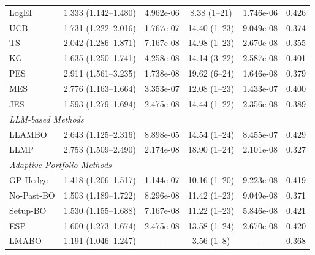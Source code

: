 \begin{table}
\begin{tabular}{@{}lccccc@{}}
LogEI & 1.333 (1.142--1.480) & 4.962e-06 & 8.38 (1--21) & 1.746e-06 & 0.426 \\
UCB & 1.731 (1.222--2.016) & 1.767e-07 & 14.40 (1--23) & 9.049e-08 & 0.374 \\
TS & 2.042 (1.286--1.871) & 7.167e-08 & 14.98 (1--23) & 2.670e-08 & 0.355 \\
KG & 1.635 (1.250--1.741) & 4.258e-08 & 14.14 (3--22) & 2.587e-08 & 0.401 \\
PES & 2.911 (1.561--3.235) & 1.738e-08 & 19.62 (6--24) & 1.646e-08 & 0.379 \\
MES & 2.776 (1.163--1.664) & 3.353e-07 & 12.08 (1--23) & 1.433e-07 & 0.400 \\
JES & 1.593 (1.279--1.694) & 2.475e-08 & 14.44 (1--22) & 2.356e-08 & 0.389 \\
\multicolumn{5}{l}{\textit{LLM-based Methods}} \\
LLAMBO & 2.643 (1.125--2.316) & 8.898e-05 & 14.54 (1--24) & 8.455e-07 & 0.429 \\
LLMP & 2.753 (1.509--2.490) & 2.174e-08 & 18.90 (1--24) & 2.101e-08 & 0.327 \\
\multicolumn{5}{l}{\textit{Adaptive Portfolio Methods}} \\
GP-Hedge & 1.418 (1.206--1.517) & 1.144e-07 & 10.16 (1--20) & 9.223e-08 & 0.419 \\
No-Past-BO & 1.503 (1.189--1.722) & 8.296e-08 & 11.42 (1--23) & 9.049e-08 & 0.371 \\
Setup-BO & 1.530 (1.155--1.688) & 7.167e-08 & 11.22 (1--23) & 5.846e-08 & 0.421 \\
ESP & 1.600 (1.273--1.674) & 2.475e-08 & 13.58 (1--24) & 2.670e-08 & 0.420 \\
\midrule
LMABO & 1.191 (1.046--1.247) & -- & 3.56 (1--8) & -- & 0.368 \\
\bottomrule
    \end{tabular}
    \end{table}
    